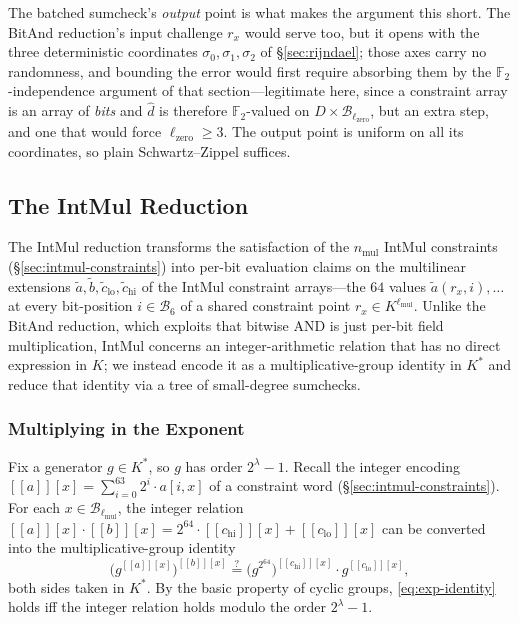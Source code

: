 \documentclass{article}
\theoremstyle{definition}
\newcommand*{\mle}{\widetilde}
\newcommand{\BB}{\mathcal{B}}
\newcommand{\FF}[1]{\mathbb{F}_{#1}}
\newcommand{\intval}[1]{[\![#1]\!]}
\begin{document}
The batched sumcheck's \emph{output} point is what makes the argument this short. The BitAnd reduction's input challenge $r_x$ would serve too, but it opens with the three deterministic coordinates $\sigma_0, \sigma_1, \sigma_2$ of \S\ref{sec:rijndael}; those axes carry no randomness, and bounding the error would first require absorbing them by the $\FF{2}$-independence argument of that section---legitimate here, since a constraint array is an array of \emph{bits} and $\widehat{d}$ is therefore $\FF{2}$-valued on $D \times \BB_{\ell_\text{zero}}$, but an extra step, and one that would force $\ell_\text{zero} \geq 3$. The output point is uniform on all its coordinates, so plain Schwartz--Zippel suffices.

\subsection{The IntMul Reduction}
\label{sec:intmul}

The IntMul reduction transforms the satisfaction of the $n_\text{mul}$ IntMul constraints (\S\ref{sec:intmul-constraints}) into per-bit evaluation claims on the multilinear extensions $\mle{a}, \mle{b}, \mle{c}_\text{lo}, \mle{c}_\text{hi}$ of the IntMul constraint arrays---the $64$ values $\mle{a}(r_x, i), \ldots$ at every bit-position $i \in \BB_6$ of a shared constraint point $r_x \in K^{\ell_\text{mul}}$. Unlike the BitAnd reduction, which exploits that bitwise AND is just per-bit field multiplication, IntMul concerns an integer-arithmetic relation that has no direct expression in $K$; we instead encode it as a multiplicative-group identity in $K^*$ and reduce that identity via a tree of small-degree sumchecks.

\subsubsection{Multiplying in the Exponent}
\label{sec:multiplying-in-exponent}

Fix a generator $g \in K^*$, so $g$ has order $2^\lambda - 1$. Recall the integer encoding $\intval{a}[x] = \sum_{i = 0}^{63} 2^i \cdot a[i, x]$ of a constraint word (\S\ref{sec:intmul-constraints}). For each $x \in \BB_{\ell_\text{mul}}$, the integer relation $\intval{a}[x] \cdot \intval{b}[x] = 2^{64} \cdot \intval{c_\text{hi}}[x] + \intval{c_\text{lo}}[x]$ can be converted into the multiplicative-group identity
\begin{equation}
  \bigl( g^{\intval{a}[x]} \bigr)^{\intval{b}[x]} \stackrel{?}{=} \bigl( g^{2^{64}} \bigr)^{\intval{c_\text{hi}}[x]} \cdot g^{\intval{c_\text{lo}}[x]},
  \label{eq:exp-identity}
\end{equation}
both sides taken in $K^*$. By the basic property of cyclic groups, \eqref{eq:exp-identity} holds iff the integer relation holds modulo the order $2^\lambda - 1$.
\end{document}
